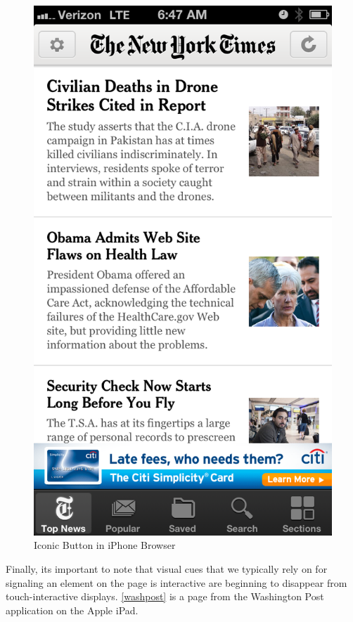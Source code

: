\begin{figure}
\centerline{
\includegraphics[scale=.2]{chapter8.tex/button-mobile}
}
\caption{Iconic Button in iPhone Browser}
\label{moble-button}
\end{figure}


Finally, its important to note that visual cues that we typically rely on for signaling an element on the page is interactive are beginning to disappear from touch-interactive displays.  \autoref{washpost}  is a page from the Washington Post application on the Apple iPad.


